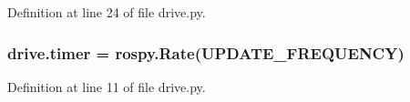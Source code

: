 Definition at line 24 of file drive.\+py.

\subsubsection[{\texorpdfstring{timer}{timer}}]{\setlength{\rightskip}{0pt plus 5cm}drive.\+timer = rospy.\+Rate(U\+P\+D\+A\+T\+E\+\_\+\+F\+R\+E\+Q\+U\+E\+N\+CY)}\hypertarget{namespacedrive_ad7f80b53042960cd3cf968dee1ebb197}{}\label{namespacedrive_ad7f80b53042960cd3cf968dee1ebb197}


Definition at line 11 of file drive.\+py.

